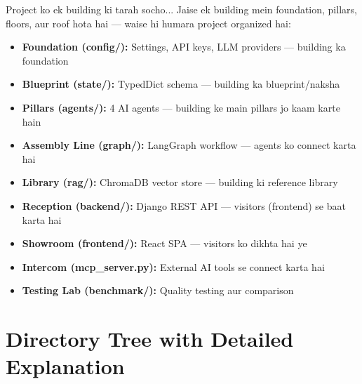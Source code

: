 \documentclass[11pt,a4paper,twoside]{report}
\begin{document}
\begin{storybox}{Project ko ek building ki tarah socho...}
Jaise ek building mein foundation, pillars, floors, aur roof hota hai --- waise hi humara project organized hai:
\begin{itemize}
    \item \textbf{Foundation (config/):} Settings, API keys, LLM providers --- building ka foundation
    \item \textbf{Blueprint (state/):} TypedDict schema --- building ka blueprint/naksha
    \item \textbf{Pillars (agents/):} 4 AI agents --- building ke main pillars jo kaam karte hain
    \item \textbf{Assembly Line (graph/):} LangGraph workflow --- agents ko connect karta hai
    \item \textbf{Library (rag/):} ChromaDB vector store --- building ki reference library
    \item \textbf{Reception (backend/):} Django REST API --- visitors (frontend) se baat karta hai
    \item \textbf{Showroom (frontend/):} React SPA --- visitors ko dikhta hai ye
    \item \textbf{Intercom (mcp\_server.py):} External AI tools se connect karta hai
    \item \textbf{Testing Lab (benchmark/):} Quality testing aur comparison
\end{itemize}
\end{storybox}

\section{Directory Tree with Detailed Explanation}
\end{document}
